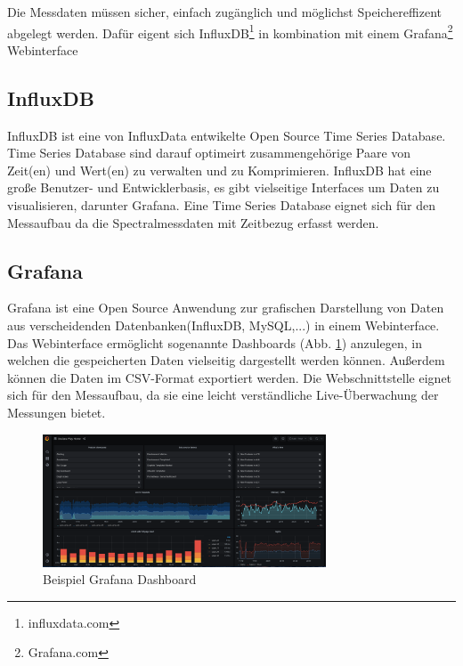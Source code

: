 Die Messdaten müssen sicher, einfach zugänglich und möglichst Speichereffizent abgelegt werden.
Dafür eigent sich InfluxDB\footnote{influxdata.com} in kombination mit einem Grafana\footnote{Grafana.com} Webinterface
\subsection{InfluxDB}
InfluxDB ist eine von InfluxData entwikelte Open Source Time Series Database. 
Time Series Database  sind darauf optimeirt zusammengehörige Paare von Zeit(en) und Wert(en) zu verwalten und zu Komprimieren.
InfluxDB hat eine große Benutzer- und Entwicklerbasis, es gibt vielseitige Interfaces um Daten zu visualisieren, darunter Grafana.
Eine Time Series Database eignet sich für den Messaufbau da die Spectralmessdaten mit Zeitbezug erfasst werden.

\subsection{Grafana}
Grafana ist eine Open Source Anwendung zur grafischen Darstellung von Daten aus verscheidenden Datenbanken(InfluxDB,  MySQL,...) in einem Webinterface.
Das Webinterface ermöglicht sogenannte Dashboards (Abb. \ref{fig:Beispiel_Grafana_Dashboard}) anzulegen, in welchen die gespeicherten Daten vielseitig dargestellt werden können.
Außerdem können die Daten im CSV-Format exportiert werden.
Die Webschnittstelle eignet sich für den Messaufbau, da sie eine leicht verständliche Live-Überwachung der Messungen bietet.
\begin{figure}[ht!]
\centering
\includegraphics[width=0.75\textwidth]{img/Beispiel_Grafana_Dashboard}
\caption{Beispiel Grafana Dashboard}
\label{fig:Beispiel_Grafana_Dashboard}
\end{figure}